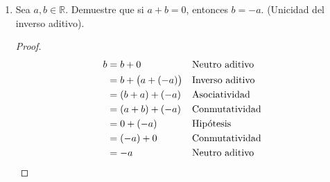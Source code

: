 \documentclass[11pt]{article}
\newcommand{\R}{\mathbb{R}}
\begin{document}
\begin{enumerate}[label=\alph*)]
    \item Sea $a,b\in \R$. Demuestre que si $a+b=0$, entonces $b=-a$. (Unicidad del inverso aditivo).
    \vspace{-1em}\begin{proof}
    \begin{align*}
            b &= b + 0 && \text{Neutro aditivo}\\
            &= b + \bigl(a+(-a)\bigr) && \text{Inverso aditivo}\\
            &= (b+a) + (-a) && \text{Asociatividad}\\
            &= (a+b) + (-a) && \text{Conmutatividad}\\
            &= 0 + (-a) && \text{Hipótesis}\\
            &= (-a) + 0 && \text{Conmutatividad}\\
            &= -a && \text{Neutro aditivo} \qedhere
        \end{align*}
    \end{proof} \vspace{-1em}


\end{enumerate}
\end{document}
